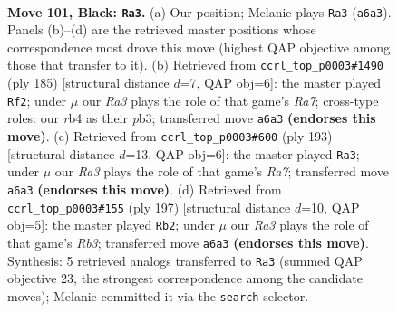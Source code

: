 \documentclass[11pt]{article}
\begin{document}
\clearpage

\begin{figure}[p]\centering
\begin{subfigure}{0.46\textwidth}\centering
\resizebox{\linewidth}{!}{%
\newchessgame
\chessboard[
  setfen={8/3k4/r3p3/7R/1R2P3/5P2/5K2/8 b - - 6 101},
  showmover=false,
  pgfstyle=straightmove, color=movearrow, markmove={a6-a3}
]}
\caption{}
\end{subfigure}\hfill
\begin{subfigure}{0.46\textwidth}\centering
\resizebox{\linewidth}{!}{%
\newchessgame
\chessboard[
  setfen={8/4kp2/1R6/6P1/4KP2/1P6/r7/8 b - - 0 93},
  showmover=false,
  pgfstyle=straightmove, color=movearrow, markmove={a2-f2}
]}
\caption{}
\end{subfigure}
\\[4pt]
\begin{subfigure}{0.46\textwidth}\centering
\resizebox{\linewidth}{!}{%
\newchessgame
\chessboard[
  setfen={8/5pk1/1R6/6P1/5PK1/8/r7/8 b - - 12 97},
  showmover=false,
  pgfstyle=straightmove, color=movearrow, markmove={a2-a3}
]}
\caption{}
\end{subfigure}\hfill
\begin{subfigure}{0.46\textwidth}\centering
\resizebox{\linewidth}{!}{%
\newchessgame
\chessboard[
  setfen={6R1/8/1r6/5k2/5p2/5P2/6PK/8 b - - 6 99},
  showmover=false,
  pgfstyle=straightmove, color=movearrow, markmove={b6-b2}
]}
\caption{}
\end{subfigure}
\caption{\textbf{Move 101, Black: \texttt{Ra3}.} (a) Our position; Melanie plays \texttt{Ra3} (\texttt{a6a3}). Panels (b)--(d) are the retrieved master positions whose correspondence most drove this move (highest QAP objective among those that transfer to it). (b) Retrieved from \texttt{ccrl\_top\_p0003\#1490} (ply 185) [structural distance $d$=7, QAP obj=6]: the master played \texttt{Rf2}; under $\mu$ our \emph{Ra3} plays the role of that game's \emph{Ra7}; cross-type roles: our \emph{r}b4 as their \emph{p}b3; transferred move \texttt{a6a3} \textbf{(endorses this move)}. (c) Retrieved from \texttt{ccrl\_top\_p0003\#600} (ply 193) [structural distance $d$=13, QAP obj=6]: the master played \texttt{Ra3}; under $\mu$ our \emph{Ra3} plays the role of that game's \emph{Ra7}; transferred move \texttt{a6a3} \textbf{(endorses this move)}. (d) Retrieved from \texttt{ccrl\_top\_p0003\#155} (ply 197) [structural distance $d$=10, QAP obj=5]: the master played \texttt{Rb2}; under $\mu$ our \emph{Ra3} plays the role of that game's \emph{Rb3}; transferred move \texttt{a6a3} \textbf{(endorses this move)}. Synthesis: 5 retrieved analogs transferred to \texttt{Ra3} (summed QAP objective 23, the strongest correspondence among the candidate moves); Melanie committed it via the \texttt{search} selector.}
\label{fig:thought-m201}
\end{figure}
\end{document}
